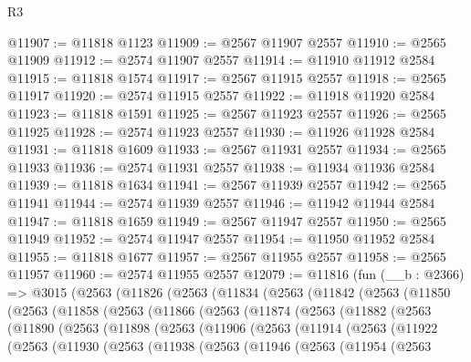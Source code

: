 \begin{lexlean}{R3}
\begin{coremodule}
@11907 := @11818 @1123
@11909 := @2567 @11907 @2557
@11910 := @2565 @11909
@11912 := @2574 @11907 @2557
@11914 := @11910 @11912 @2584
@11915 := @11818 @1574
@11917 := @2567 @11915 @2557
@11918 := @2565 @11917
@11920 := @2574 @11915 @2557
@11922 := @11918 @11920 @2584
@11923 := @11818 @1591
@11925 := @2567 @11923 @2557
@11926 := @2565 @11925
@11928 := @2574 @11923 @2557
@11930 := @11926 @11928 @2584
@11931 := @11818 @1609
@11933 := @2567 @11931 @2557
@11934 := @2565 @11933
@11936 := @2574 @11931 @2557
@11938 := @11934 @11936 @2584
@11939 := @11818 @1634
@11941 := @2567 @11939 @2557
@11942 := @2565 @11941
@11944 := @2574 @11939 @2557
@11946 := @11942 @11944 @2584
@11947 := @11818 @1659
@11949 := @2567 @11947 @2557
@11950 := @2565 @11949
@11952 := @2574 @11947 @2557
@11954 := @11950 @11952 @2584
@11955 := @11818 @1677
@11957 := @2567 @11955 @2557
@11958 := @2565 @11957
@11960 := @2574 @11955 @2557
@12079 := @11816
    (fun (__b : @2366) =>
    @3015
      (@2563
        (@11826
          (@2563
            (@11834
              (@2563
                (@11842
                  (@2563
                    (@11850
                      (@2563
                        (@11858
                          (@2563
                            (@11866
                              (@2563
                                (@11874
                                  (@2563
                                    (@11882
                                      (@2563
                                        (@11890
                                          (@2563
                                            (@11898
                                              (@2563
                                                (@11906
                                                  (@2563
                                                    (@11914
                                                      (@2563
                                                        (@11922
                                                          (@2563
                                                            (@11930
                                                              (@2563
                                                                (@11938
                                                                  (@2563
                                                                    (@11946
                                                                      (@2563
                                                                        (@11954
                                                                          (@2563

\end{coremodule}
\end{lexlean}
